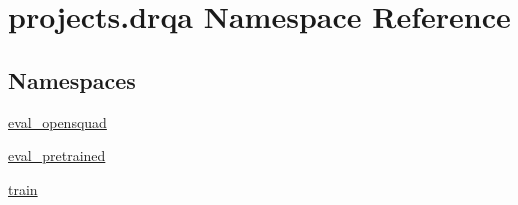 \hypertarget{namespaceprojects_1_1drqa}{}\section{projects.\+drqa Namespace Reference}
\label{namespaceprojects_1_1drqa}
\subsection*{Namespaces}
\begin{DoxyCompactItemize}
\item 
 \hyperlink{namespaceprojects_1_1drqa_1_1eval__opensquad}{eval\+\_\+opensquad}
\item 
 \hyperlink{namespaceprojects_1_1drqa_1_1eval__pretrained}{eval\+\_\+pretrained}
\item 
 \hyperlink{namespaceprojects_1_1drqa_1_1train}{train}
\end{DoxyCompactItemize}
